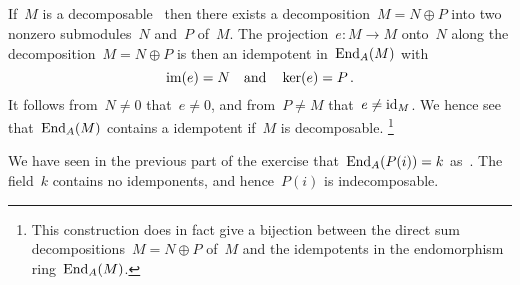 \subsection{}

If~$M$ is a decomposable~{} then there exists a decomposition~$M = N \oplus P$ into two nonzero submodules~$N$ and~$P$ of~$M$.
The projection~$e \colon M \to M$ onto~$N$ along the decomposition~$M = N \oplus P$ is then an idempotent in~$\operatorname{End}_A(M)$ with
\[
  \operatorname{im}(e) = N
  \quad\text{and}\quad
  \ker(e) = P \,.
\]
It follows from~$N \neq 0$ that~$e \neq 0$, and from~$P \neq M$ that~$e \neq \operatorname{id}_M$.
We hence see that~$\operatorname{End}_A(M)$ contains a  idempotent if~$M$ is decomposable.%
\footnote{This construction does in fact give a bijection between the direct sum decompositions~$M = N \oplus P$ of~$M$ and the idempotents in the endomorphism ring~$\operatorname{End}_A(M)$.}

We have seen in the previous part of the exercise that~$\operatorname{End}_A(P(i)) = k$ as~{\kalgs}.
The field~$k$ contains no  idemponents, and hence~$P(i)$ is indecomposable.




